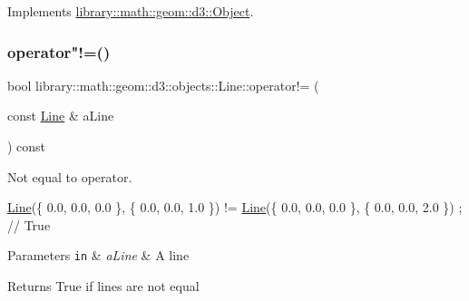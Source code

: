 Implements \hyperlink{classlibrary_1_1math_1_1geom_1_1d3_1_1_object_a2216442e322f0c3ca5f01a4efa22baf7}{library\+::math\+::geom\+::d3\+::\+Object}.

\mbox{\label{classlibrary_1_1math_1_1geom_1_1d3_1_1objects_1_1_line_ae49d3224ab2f209f192bb3b1e152766e}} 
\subsubsection{\texorpdfstring{operator"!=()}{operator!=()}}
{\footnotesize\ttfamily bool library\+::math\+::geom\+::d3\+::objects\+::\+Line\+::operator!= (\begin{DoxyParamCaption}\item[{const \hyperlink{classlibrary_1_1math_1_1geom_1_1d3_1_1objects_1_1_line}{Line} \&}]{a\+Line }\end{DoxyParamCaption}) const}



Not equal to operator. 


\begin{DoxyCode}
\hyperlink{classlibrary_1_1math_1_1geom_1_1d3_1_1objects_1_1_line_a762e529453ff9ffa9233fd73737f4692}{Line}(\{ 0.0, 0.0, 0.0 \}, \{ 0.0, 0.0, 1.0 \}) != \hyperlink{classlibrary_1_1math_1_1geom_1_1d3_1_1objects_1_1_line_a762e529453ff9ffa9233fd73737f4692}{Line}(\{ 0.0, 0.0, 0.0 \}, \{ 0.0, 0.0, 2.0 \}) ; \textcolor{comment}{// True}
\end{DoxyCode}



\begin{DoxyParams}[1]{Parameters}
\mbox{\tt in}  & {\em a\+Line} & A line \\
\hline
\end{DoxyParams}
\begin{DoxyReturn}{Returns}
True if lines are not equal 
\end{DoxyReturn}
\mbox{\label{classlibrary_1_1math_1_1geom_1_1d3_1_1objects_1_1_line_a2e5b0da1d652abbff16d7024f8eecb0a}} 
